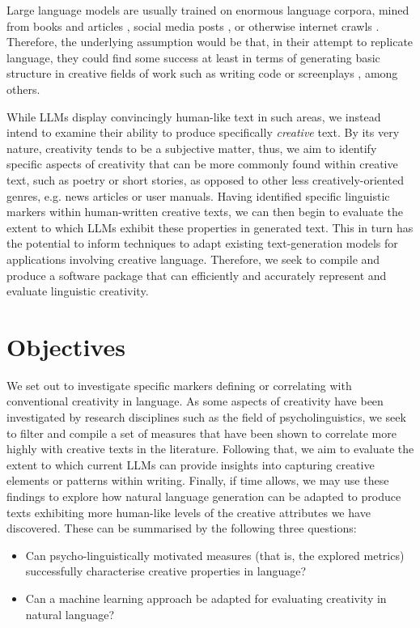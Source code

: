 Large language models are usually trained on enormous language corpora, mined from books and articles \citep{gutenberg_dataset}, social media posts \citep{broad_twitter}, or otherwise internet crawls \citep{thepile_dataset}. Therefore, the underlying assumption would be that, in their attempt to replicate language, they could find some success at least in terms of generating basic structure in creative fields of work such as writing code \citep{codex_2021_copilot} or screenplays \citep{mirowski_co-writing_2022}, among others. 

While LLMs display convincingly human-like text in such areas, we instead intend to examine their ability to produce specifically \emph{creative} text. By its very nature, creativity tends to be a subjective matter, thus, we aim to identify specific aspects of creativity that can be more commonly found within creative text, such as poetry or short stories, as opposed to other less creatively-oriented genres, e.g. news articles or user manuals. Having identified specific linguistic markers within human-written creative texts, we can then begin to evaluate the extent to which LLMs exhibit these properties in generated text. This in turn has the potential to inform techniques to adapt existing text-generation models for applications involving creative language. Therefore, we seek to compile and produce a software package that can efficiently and accurately represent and evaluate linguistic creativity. 

\section{Objectives}

We set out to investigate specific markers defining or correlating with conventional creativity in language. As some aspects of creativity have been investigated by research disciplines such as the field of psycholinguistics, we seek to filter and compile a set of measures that have been shown to correlate more highly with creative texts in the literature. 
Following that, we aim to evaluate the extent to which current LLMs can provide insights into capturing creative elements or patterns within writing. Finally, if time allows, we may use these findings to explore how natural language generation can be adapted to produce texts exhibiting more human-like levels of the creative attributes we have discovered. These can be summarised by the following three questions:

\begin{itemize}
    \item Can psycho-linguistically motivated measures (that is, the explored metrics) successfully characterise creative properties in language?
    \item Can a machine learning approach be adapted for evaluating creativity in natural language?
\end{itemize}

